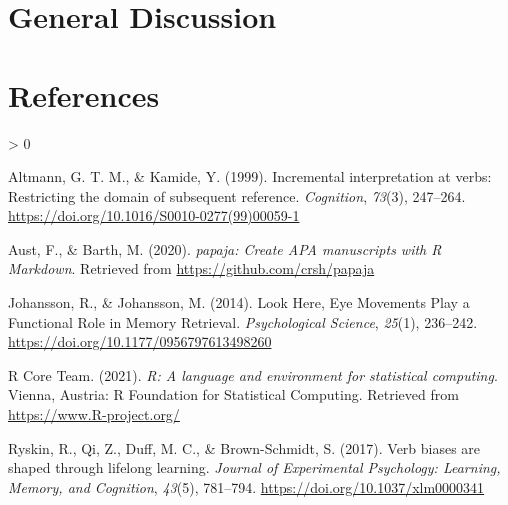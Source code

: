\documentclass[
  english,
  man]{apa6}
\newlength{\cslhangindent}
\newenvironment{CSLReferences}[2] %
 {%
  \setlength{\parindent}{0pt}
  \ifodd #1 \everypar{\setlength{\hangindent}{\cslhangindent}}\ignorespaces\fi
  \ifnum #2 > 0
  \setlength{\parskip}{#2\baselineskip}
  \fi
 }%
 {}
\begin{document}
\hypertarget{general-discussion}{%
\section{General Discussion}\label{general-discussion}}

\newpage

\hypertarget{references}{%
\section{References}\label{references}}

\begingroup
\setlength{\parindent}{-0.5in}
\setlength{\leftskip}{0.5in}

\hypertarget{refs}{}
\begin{CSLReferences}{1}{0}
\leavevmode\hypertarget{ref-altmannIncrementalInterpretationVerbs1999}{}%
Altmann, G. T. M., \& Kamide, Y. (1999). Incremental interpretation at verbs: Restricting the domain of subsequent reference. \emph{Cognition}, \emph{73}(3), 247--264. \url{https://doi.org/10.1016/S0010-0277(99)00059-1}

\leavevmode\hypertarget{ref-R-papaja}{}%
Aust, F., \& Barth, M. (2020). \emph{{papaja}: {Create} {APA} manuscripts with {R Markdown}}. Retrieved from \url{https://github.com/crsh/papaja}

\leavevmode\hypertarget{ref-johanssonLookHereEye2014}{}%
Johansson, R., \& Johansson, M. (2014). Look {Here}, {Eye Movements Play} a {Functional Role} in {Memory Retrieval}. \emph{Psychological Science}, \emph{25}(1), 236--242. \url{https://doi.org/10.1177/0956797613498260}

\leavevmode\hypertarget{ref-R-base}{}%
R Core Team. (2021). \emph{R: A language and environment for statistical computing}. Vienna, Austria: R Foundation for Statistical Computing. Retrieved from \url{https://www.R-project.org/}

\leavevmode\hypertarget{ref-ryskinVerbBiasesAre2017}{}%
Ryskin, R., Qi, Z., Duff, M. C., \& Brown-Schmidt, S. (2017). Verb biases are shaped through lifelong learning. \emph{Journal of Experimental Psychology: Learning, Memory, and Cognition}, \emph{43}(5), 781--794. \url{https://doi.org/10.1037/xlm0000341}

\end{CSLReferences}

\endgroup
\end{document}
